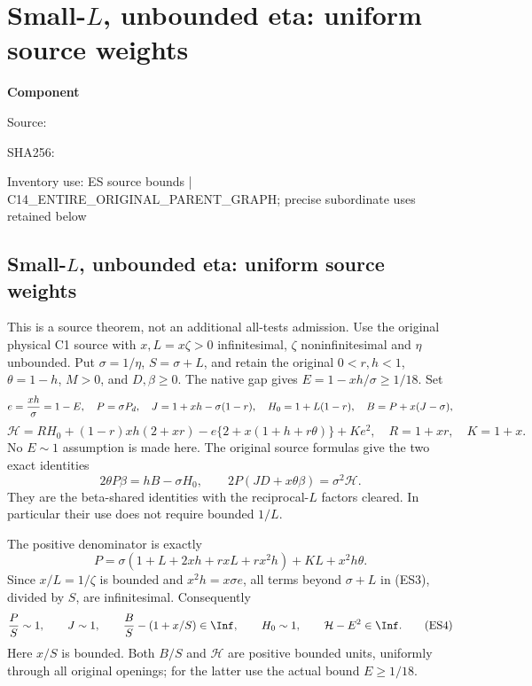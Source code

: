 \chapter{Small-$L$, unbounded eta: uniform source weights}
\label{component:p66922bb7f235}
\noindent\textbf{Component }\par
{\small\noindent Source: \par}
{\small\noindent SHA256: \par}
{\small\noindent Inventory use: ES source bounds | C14\_\allowbreak{}ENTIRE\_\allowbreak{}ORIGINAL\_\allowbreak{}PARENT\_\allowbreak{}GRAPH; precise subordinate uses retained below\par}
\medskip
\section{Small-$L$, unbounded eta: uniform source weights}
\label{p66922bb7f235:sec:r13-small-L-eta-large-bounds}

This is a source theorem, not an additional all-tests admission.
Use the original physical C1 source with $x,L=x\zeta>0$
infinitesimal, $\zeta$ noninfinitesimal and $\eta$ unbounded.
Put $\sigma=1/\eta$, $S=\sigma+L$, and retain the original
$0<r,h<1$, $\theta=1-h$, $M>0$, and $D,\beta\ge0$.
The native gap gives $E=1-xh/\sigma\ge1/18$. Set
\[
 e={xh\over\sigma}=1-E,\quad
 P=\sigma P_d,\quad J=1+xh-\sigma(1-r),\quad
 H_0=1+L(1-r),\quad B=P+x(J-\sigma),
\]
\[
 \mathcal H=R H_0+(1-r)xh(2+xr)
 -e\{2+x(1+h+r\theta)\}+Ke^2,
 \quad R=1+xr,\quad K=1+x.                           \tag{ES1}
\]
No $E\sim1$ assumption is made here. The original source formulas
give the two exact identities
\[
 2\theta P\beta=hB-\sigma H_0,\qquad
 2P(JD+x\theta\beta)=\sigma^2\mathcal H.             \tag{ES2}
\]
They are the beta-shared identities with the reciprocal-$L$ factors
cleared. In particular their use does not require bounded $1/L$.

The positive denominator is exactly
\[
 P=\sigma(1+L+2xh+rxL+rx^2h)+KL+x^2h\theta.
                                                               \tag{ES3}
\]
Since $x/L=1/\zeta$ is bounded and $x^2h=x\sigma e$,
all terms beyond $\sigma+L$ in (ES3), divided by $S$, are
infinitesimal. Consequently
\[
 {P\over S}\sim1,\qquad J\sim1,\qquad
 {B\over S}-(1+x/S)\in\Inf,\qquad
 H_0\sim1,\qquad \mathcal H-E^2\in\Inf.             \tag{ES4}
\]
Here $x/S$ is bounded. Both $B/S$ and $\mathcal H$ are
positive bounded units, uniformly through all original openings;
for the latter use the actual bound $E\ge1/18$.

